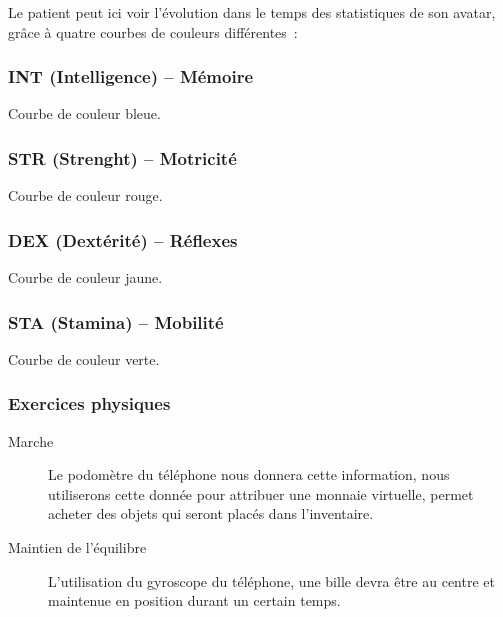 \documentclass[a4paper,12pt,francais]{article}
\begin{document}
Le patient peut ici voir l'évolution dans le temps des statistiques de son avatar, grâce à quatre courbes de couleurs différentes~:

\subsubsection{INT (Intelligence) – Mémoire}
Courbe de couleur bleue.

\subsubsection{STR (Strenght) – Motricité}
Courbe de couleur rouge.

\subsubsection{DEX (Dextérité) – Réflexes}
Courbe de couleur jaune.

\subsubsection{STA (Stamina) – Mobilité}
Courbe de couleur verte.



\subsubsection{Exercices physiques}
\begin{description}
    \item[Marche] Le podomètre du téléphone nous donnera cette information, nous utiliserons cette donnée pour attribuer une monnaie virtuelle, permet acheter des objets qui seront placés dans l'inventaire.
    \item[Maintien de l’équilibre] L’utilisation du gyroscope du téléphone, une bille devra être au centre et maintenue en position durant un certain temps.
\end{description}
\end{document}

